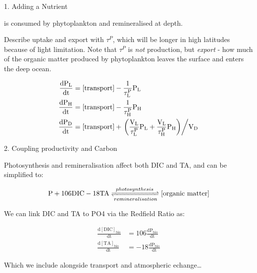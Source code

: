 \documentclass[aspectratio=169]{beamer}
\begin{document}
\begin{frame}{1. Adding a Nutrient}

     is consumed by phytoplankton and remineralised at depth. 
    
    Describe uptake and export with $\tau^P$, which will be longer in high latitudes because of light limitation. Note that $\tau^P$ is \textit{not} production, but \textit{export} - how much of the organic matter produced by phytoplankton leaves the surface and enters the deep ocean.

    \begin{align*}
        \mathrm{\frac{\mathrm{d}P_L}{\mathrm{d}t}} &= \mathrm{[\mathrm{transport}] - \frac{1}{\tau^P_L} P_L} \\
        \mathrm{\frac{\mathrm{d}P_H}{\mathrm{d}t}} &= \mathrm{[\mathrm{transport}] - \frac{1}{\tau^P_H} P_H} \\
        \mathrm{\frac{\mathrm{d}P_D}{\mathrm{d}t}} &= \mathrm{[\mathrm{transport}] + \left. \left( \frac{V_L}{\tau^P_L} P_L + \frac{V_L}{\tau^P_H} P_H \right) \middle/ V_D \right.}
    \end{align*}

\end{frame}

\begin{frame}{2. Coupling productivity and Carbon}

    Photosynthesis and remineralisation affect both DIC and TA, and can be simplified to:

    $$
    \mathrm{P + 106 DIC - 18 TA \xrightleftharpoons[remineralisation]{photosynthesis} [organic~matter]}
    $$

    We can link DIC and TA to PO4 via the Redfield Ratio as:

    \begin{align*}
        \mathrm{\frac{d[DIC]_{bio}}{dt}} &= \mathrm{106 \frac{dP_{bio}}{dt}} \\
        \mathrm{\frac{d[TA]_{bio}}{dt}} &= \mathrm{-18 \frac{dP_{bio}}{dt}}
    \end{align*}

    Which we include alongside transport and atmospheric echange\dots

\end{frame}
\end{document}
